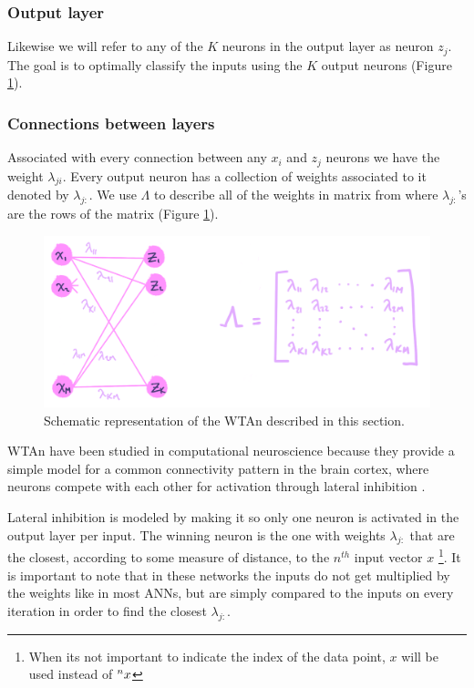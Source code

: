 \documentclass{article}
\begin{document}
\subsubsection*{Output layer}
Likewise we will refer to any of the \(K\) neurons in the output layer as neuron \(z_j\). The goal is to optimally classify the inputs using the \(K\) output neurons (Figure \ref{WTA}). 

\subsubsection*{Connections between layers}
Associated with every connection between any \(x_i\) and \(z_j\) neurons we have the weight \(\lambda_{ji}\). Every output neuron has a collection of weights associated to it denoted by \(\lambda_{j:}\). We use \(\Lambda\) to describe all of the weights in matrix from where \(\lambda_{j:}\)'s are the rows of the matrix (Figure \ref{WTA}). 

\begin{figure}[h]
    \includegraphics[width=\textwidth]{img/Untitled_Artwork.png}
    \caption{Schematic representation of the WTAn described in this section. \label{WTA}}
\end{figure}

WTAn have been studied in computational neuroscience because they provide a simple
model for a common connectivity pattern in the brain cortex, where
neurons compete with each other for activation through lateral
inhibition \cite{Keck2012}.

Lateral inhibition is modeled by making it so only one neuron is activated in the output layer per input. The winning neuron is the one with weights \(\lambda_{j:}\) that are the closest,
according to some measure of distance, to the \(n^{th}\) input vector
\(x\) \footnote{When its not important to indicate the index of the data point,
\(x\) will be used instead of \(\prescript{n}{}{x}\)}. It is important to note that in these networks the inputs do not get multiplied by the weights like in most ANNs, but are simply compared to the inputs on every iteration in order to find the closest \(\lambda_{j:}\). 
\end{document}
